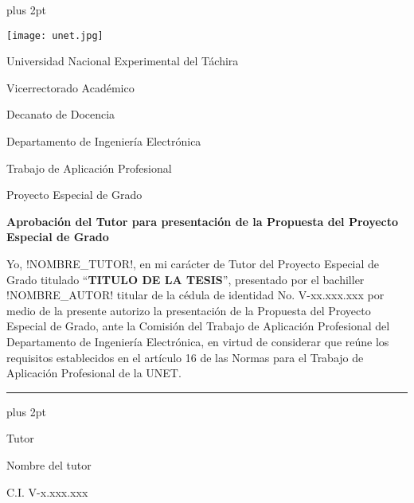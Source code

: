 \begin{titlepage}
\parskip=7.25pt plus 2pt
\setcounter{page}{4}
\begin{center}
	\begin{spacing}{1}
	\texttt{[image: unet.jpg]}
	
	Universidad Nacional Experimental del Táchira 
	
	Vicerrectorado Académico
	
	Decanato de Docencia
	
	Departamento de Ingeniería Electrónica
	
	Trabajo de Aplicación Profesional
	
	Proyecto Especial de Grado
	\end{spacing}
\end{center}

\vspace{0.5cm}

\begin{center}
		
		\textbf{Aprobación del Tutor para presentación de la Propuesta del Proyecto Especial de Grado}
		
\end{center}

\vspace{0.5cm}

\begin{spacing}{1.5}
	Yo, !NOMBRE\_TUTOR!, en mi carácter de Tutor del Proyecto Especial de Grado titulado \enquote{\textbf{TITULO DE LA TESIS}}, presentado por el bachiller !NOMBRE\_AUTOR! titular de la cédula de identidad No. \mbox{V-xx.xxx.xxx} por medio de la presente autorizo la presentación de la Propuesta del Proyecto Especial de Grado, ante la Comisión del Trabajo de Aplicación Profesional del Departamento de Ingeniería Electrónica, en virtud de considerar que reúne los requisitos establecidos en el artículo 16 de las Normas para el Trabajo de Aplicación Profesional de la UNET.
\end{spacing}

\vfill

\begin{center}
	
	\rule{6cm}{1pt}
	
	\vspace{0.2cm}
	
	\parskip=0pt plus 2pt
    
    \begin{spacing}{1}
        Tutor
    
        Nombre del tutor
    
        C.I. V-x.xxx.xxx
    \end{spacing}
\end{center}

\vspace{0.5cm}

\end{titlepage}